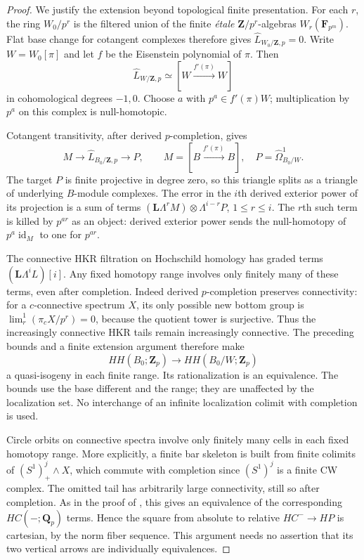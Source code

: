 \documentclass[11pt,a4paper]{article}
\theoremstyle{remark}
\begin{document}
\begin{proof}
We justify the extension beyond topological finite presentation.
For each $r$, the ring $W_0/p^r$ is the filtered union of the
finite \emph{\'{e}tale} $\mathbf Z/p^r$-algebras
$W_r(\mathbf F_{p^m})$. Flat base change for cotangent complexes
therefore gives $\widehat L_{W_0/\mathbf Z,p}=0$.
Write $W=W_0[\pi]$ and let $f$ be the Eisenstein polynomial of
$\pi$. Then
\[
 \widehat L_{W/\mathbf Z,p}
   \simeq[W\xrightarrow{f'(\pi)}W]
\]
in cohomological degrees $-1,0$. Choose $a$ with
$p^a\in f'(\pi)W$; multiplication by $p^a$ on this complex is
null-homotopic.

Cotangent transitivity, after derived $p$-completion, gives
\[
 M\longrightarrow\widehat L_{B_0/\mathbf Z,p}
       \longrightarrow P,
 \qquad M=[B\xrightarrow{f'(\pi)}B],\quad
 P=\widehat\Omega^1_{B_0/W}.
\]
The target $P$ is finite projective in degree zero, so this
triangle splits as a triangle of underlying $B$-module
complexes. The error in the $i$th derived exterior power of its
projection is a sum of terms
$(\mathbf L\Lambda^rM)\otimes\Lambda^{i-r}P$, $1\le r\le i$.
The $r$th such term is killed by $p^{ar}$ as an object: derived
exterior power sends the null-homotopy of $p^a\operatorname{id}_M$
to one for $p^{ar}$.

The connective HKR filtration on Hochschild homology has graded
terms $(\mathbf L\Lambda^iL)[i]$. Any fixed homotopy range
involves only finitely many of these terms, even after completion.
Indeed derived $p$-completion preserves connectivity: for a
$c$-connective spectrum $X$, its only possible new bottom group
is $\lim^1_r(\pi_cX/p^r)=0$, because the quotient tower is
surjective. Thus the increasingly connective HKR tails remain
increasingly connective. The preceding bounds
and a finite extension argument therefore make
\[
 HH(B_0;\mathbf Z_p)\longrightarrow HH(B_0/W;\mathbf Z_p)
\]
a quasi-isogeny in each finite range. Its rationalization is an
equivalence. The bounds use the base different and the range;
they are unaffected by the localization set. No interchange of
an infinite localization colimit with completion is used.

Circle orbits on connective spectra involve only finitely many
cells in each fixed homotopy range. More explicitly, a finite
bar skeleton is built from finite colimits of
$(S^1)^j_+\wedge X$, which commute with completion since
$(S^1)^j$ is a finite CW complex. The omitted tail has arbitrarily
large connectivity, still so after completion. As in the proof of
\cite[Proposition~4.10]{AMMN}, this gives an equivalence of the
corresponding $HC(-;\mathbf Q_p)$ terms. Hence the square from
absolute to relative $HC^-\to HP$ is cartesian, by the norm
fiber sequence. This argument needs no assertion that its two
vertical arrows are individually equivalences.


\end{proof}
\end{document}

